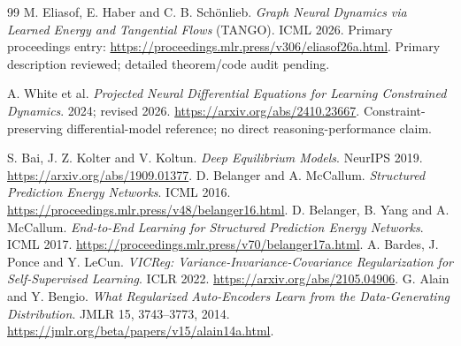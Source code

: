 \documentclass[11pt,a4paper]{article}
\begin{document}
\begin{thebibliography}{99}
 M. Eliasof, E. Haber and C. B. Sch\"onlieb. \emph{Graph Neural Dynamics via Learned Energy and Tangential Flows} (TANGO). ICML 2026. Primary proceedings entry: \url{https://proceedings.mlr.press/v306/eliasof26a.html}. Primary description reviewed; detailed theorem/code audit pending.

 A. White et al. \emph{Projected Neural Differential Equations for Learning Constrained Dynamics}. 2024; revised 2026. \url{https://arxiv.org/abs/2410.23667}. Constraint-preserving differential-model reference; no direct reasoning-performance claim.

 S. Bai, J. Z. Kolter and V. Koltun. \emph{Deep Equilibrium Models}. NeurIPS 2019. \url{https://arxiv.org/abs/1909.01377}.
 D. Belanger and A. McCallum. \emph{Structured Prediction Energy Networks}. ICML 2016. \url{https://proceedings.mlr.press/v48/belanger16.html}.
 D. Belanger, B. Yang and A. McCallum. \emph{End-to-End Learning for Structured Prediction Energy Networks}. ICML 2017. \url{https://proceedings.mlr.press/v70/belanger17a.html}.
 A. Bardes, J. Ponce and Y. LeCun. \emph{VICReg: Variance-Invariance-Covariance Regularization for Self-Supervised Learning}. ICLR 2022. \url{https://arxiv.org/abs/2105.04906}.
 G. Alain and Y. Bengio. \emph{What Regularized Auto-Encoders Learn from the Data-Generating Distribution}. JMLR 15, 3743--3773, 2014. \url{https://jmlr.org/beta/papers/v15/alain14a.html}.
\end{thebibliography}
\end{document}
